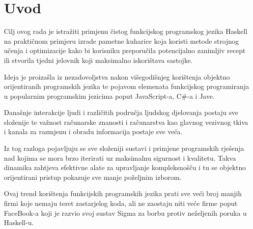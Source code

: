 \chapter{Uvod}

Cilj ovog rada je istražiti primjenu čistog funkcijskog programskog jezika Haskell na praktičnom primjeru izrade pametne kuharice koja koristi metode strojnog učenja i optimizacije kako bi korisniku preporučila potencijalno zanimljiv recept ili stvorila tjedni jelovnik koji maksimalno iskorištava sastojke.

Ideja je proizašla iz nezadovoljstva nakon višegodišnjeg korištenja objektno orijentiranih programskih jezika te pojavom elemenata funkcijskog programiranja u popularnim programskim jezicima poput JavaScript-a, C\#-a i Jave.

Današnje interakcije ljudi i različitih područja ljudskog djelovanja postaju sve složenije te važnost računarske znanosti i računarstva kao glavnog vezivnog tkiva i kanala za razmjenu i obradu informacija postaje sve veća.

Iz tog razloga pojavljuju se sve složeniji sustavi i primjene programskih rješenja nad kojima se mora brzo iterirati uz maksimalnu sigurnost i kvalitetu. Takva dinamika zahtjeva efektivne alate za upravljanje kompleksnošču i tu se objektno orijentirani pristup pokazuje sve manje poželjnim izborom.

Ovaj trend korištenja funkcijskih programskih jezika prati sve veći broj manjih firmi koje nemaju teret zastarjelog  koda, ali ne zaostaju niti veće firme poput FaceBook-a koji je razvio svoj sustav Sigma\cite{sigma} za borbu protiv neželjenih poruka  u Haskell-u.


